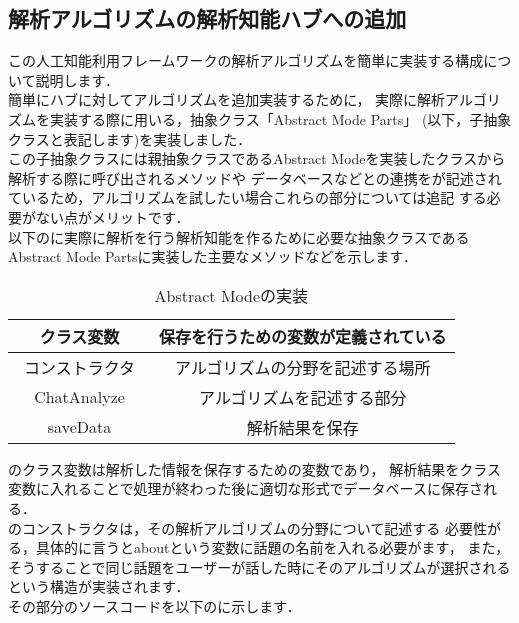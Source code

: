 
\subsection{解析アルゴリズムの解析知能ハブへの追加}
この人工知能利用フレームワークの解析アルゴリズムを簡単に実装する構成について説明します．\\

簡単にハブに対してアルゴリズムを追加実装するために，
実際に解析アルゴリズムを実装する際に用いる，抽象クラス「Abstract Mode Parts」
(以下，子抽象クラスと表記します)を実装しました．\\

この子抽象クラスには親抽象クラスであるAbstract Modeを実装したクラスから解析する際に呼び出されるメソッドや
データベースなどとの連携をが記述されているため，アルゴリズムを試したい場合これらの部分については追記
する必要がない点がメリットです．\\

以下のに実際に解析を行う解析知能を作るために必要な抽象クラスである
Abstract Mode Partsに実装した主要なメソッドなどを示します．
\begin{table}[tbh]
	\caption{Abstract Modeの実装} \label{tab:Abstract Mode Parts}
	\begin{center}
		\begin{tabular}[htb]{c|c}
		\hline
		クラス変数 & 保存を行うための変数が定義されている \\ \hline
		コンストラクタ　& アルゴリズムの分野を記述する場所 \\ \hline
		ChatAnalyze & アルゴリズムを記述する部分 \\ \hline
		saveData & 解析結果を保存 \\ \hline
		\end{tabular}
	\end{center}
\end{table}

のクラス変数は解析した情報を保存するための変数であり，
解析結果をクラス変数に入れることで処理が終わった後に適切な形式でデータベースに保存される．
\\

のコンストラクタは，その解析アルゴリズムの分野について記述する
必要性がる，具体的に言うとaboutという変数に話題の名前を入れる必要がます，
また，そうすることで同じ話題をユーザーが話した時にそのアルゴリズムが選択されるという構造が実装されます．\\
その部分のソースコードを以下のに示します．


